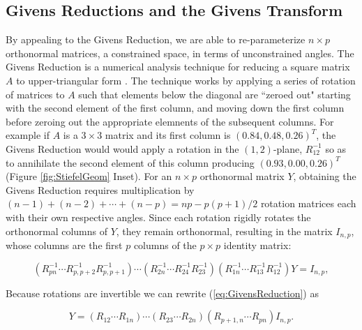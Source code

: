\documentclass{article}
\begin{document}
\subsection{Givens Reductions and the Givens Transform}\label{GivensSub}
By appealing to the Givens Reduction, we are able to re-parameterize $n \times p$ orthonormal matrices, a constrained space, in terms of unconstrained angles. The Givens Reduction is a numerical analysis technique for reducing a square matrix $A$ to upper-triangular form \citep{meyer2000matrix}. The technique works by applying a series of rotation of matrices to $A$ such that elements below the diagonal are ``zeroed out" starting with the second element of the first column, and moving down the first column before zeroing out the appropriate elemnents of the subsequent columns. For example if $A$ is a $3 \times 3$ matrix and its first column is $(0.84, 0.48, 0.26)^T$, the Givens Reduction would would apply a rotation in the $(1,2)$-plane, $R_{12}^{-1}$ so as to annihilate the second element of this column producing $(0.93, 0.00, 0.26)^T$ (Figure \ref{fig:StiefelGeom} Inset). For an $n \times p$ orthonormal matrix $Y$, obtaining the Givens Reduction requires multiplication by $(n-1)+(n-2)+\cdots+(n-p) = np -p(p+1)/2$ rotation matrices each with their own respective angles. Since each rotation rigidly rotates the orthonormal columns of $Y$, they remain orthonormal, resulting in the matrix $I_{n,p}$, whose columns are the first $p$ columns of the $p \times p$ identity matrix:

\begin{equation}
\label{eq:GivensReduction}
(R_{pn}^{-1} \cdots R_{p,p+2}^{-1} R_{p,p+1}^{-1}) \cdots (R_{2n}^{-1} \cdots R_{24}^{-1} R_{23}^{-1})(R_{1n}^{-1} \cdots R_{13}^{-1}  R_{12}^{-1})Y = I_{n,p},
\end{equation}

Because rotations are invertible we can rewrite (\ref{eq:GivensReduction}) as

\begin{equation}
\label{eq:GivensRepresentation}
Y = (R_{12} \cdots R_{1n}) \cdots (R_{23} \cdots R_{2n}) (R_{p+1,n} \cdots R_{pn}) I_{n,p}.
\end{equation}
\end{document}
